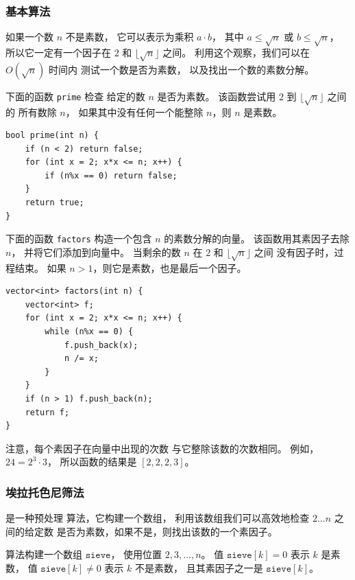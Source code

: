 \subsubsection{基本算法}

如果一个数 $n$ 不是素数，
它可以表示为乘积 $a \cdot b$，
其中 $a \le \sqrt n$ 或 $b \le \sqrt n$，
所以它一定有一个因子在 $2$ 和 $\lfloor \sqrt n \rfloor$ 之间。
利用这个观察，我们可以在 $O(\sqrt n)$ 时间内
测试一个数是否为素数，
以及找出一个数的素数分解。

下面的函数 \texttt{prime} 检查
给定的数 $n$ 是否为素数。
该函数尝试用 $2$ 到 $\lfloor \sqrt n \rfloor$ 之间的
所有数除 $n$，
如果其中没有任何一个能整除 $n$，则 $n$ 是素数。

\begin{lstlisting}
bool prime(int n) {
    if (n < 2) return false;
    for (int x = 2; x*x <= n; x++) {
        if (n%x == 0) return false;
    }
    return true;
}
\end{lstlisting}

\noindent
下面的函数 \texttt{factors}
构造一个包含 $n$ 的素数分解的向量。
该函数用其素因子去除 $n$，
并将它们添加到向量中。
当剩余的数 $n$ 在 $2$ 和 $\lfloor \sqrt n \rfloor$ 之间
没有因子时，过程结束。
如果 $n>1$，则它是素数，也是最后一个因子。

\begin{lstlisting}
vector<int> factors(int n) {
    vector<int> f;
    for (int x = 2; x*x <= n; x++) {
        while (n%x == 0) {
            f.push_back(x);
            n /= x;
        }
    }
    if (n > 1) f.push_back(n);
    return f;
}
\end{lstlisting}

注意，每个素因子在向量中出现的次数
与它整除该数的次数相同。
例如，$24=2^3 \cdot 3$，
所以函数的结果是 $[2,2,2,3]$。

\subsubsection{埃拉托色尼筛法}


是一种预处理
算法，它构建一个数组，
利用该数组我们可以高效地检查 $2 \ldots n$ 之间的给定数
是否为素数，如果不是，则找出该数的一个素因子。

算法构建一个数组 $\texttt{sieve}$，
使用位置 $2,3,\ldots,n$。
值 $\texttt{sieve}[k]=0$ 表示
$k$ 是素数，
值 $\texttt{sieve}[k] \neq 0$
表示 $k$ 不是素数，
且其素因子之一是 $\texttt{sieve}[k]$。

